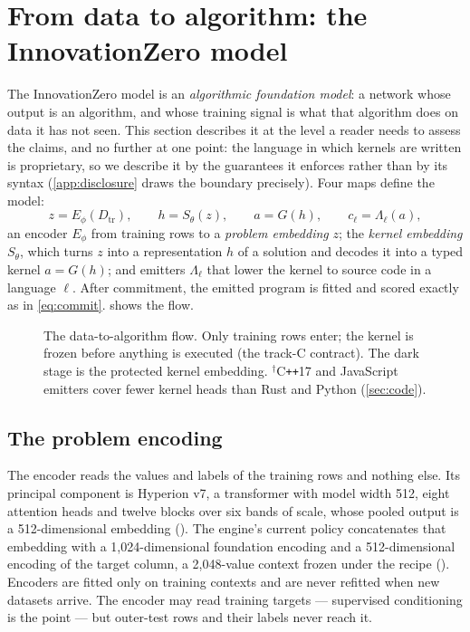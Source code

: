 \section{From data to algorithm: the InnovationZero model}
\label{sec:model}

The InnovationZero model is an \emph{algorithmic foundation model}: a network whose output is an
algorithm, and whose training signal is what that algorithm does on data it has not seen. This
section describes it at the level a reader needs to assess the claims, and no further at one
point: the language in which kernels are written is proprietary, so we describe it by the
guarantees it enforces rather than by its syntax (\cref{app:disclosure} draws the boundary
precisely). Four maps define the model:
\begin{equation}
z = E_\phi(D_{\mathrm{tr}}), \qquad h = S_\theta(z), \qquad a = G(h), \qquad c_\ell = \Lambda_\ell(a),
\label{eq:contract}
\end{equation}
an encoder $E_\phi$ from training rows to a \emph{problem embedding} $z$; the \emph{kernel
embedding} $S_\theta$, which turns $z$ into a representation $h$ of a solution and decodes it into
a typed kernel $a=G(h)$; and emitters $\Lambda_\ell$ that lower the kernel to source code in a
language $\ell$. After commitment, the emitted program is fitted and scored exactly as in
\cref{eq:commit}.  shows the flow.

\begin{figure}[t]
\centering

\caption{The data-to-algorithm flow. Only training rows enter; the kernel is frozen before anything
is executed (the track-C contract). The dark stage is the protected kernel embedding. $^\dag$C\texttt{++}17 and
JavaScript emitters cover fewer kernel heads than Rust and Python (\cref{sec:code}).}
\label{fig:pipeline}
\end{figure}

\subsection{The problem encoding}

The encoder reads the values and labels of the training rows and nothing else. Its principal
component is Hyperion v7, a transformer with model width 512, eight attention heads and twelve
blocks over six bands of scale, whose pooled output is a 512-dimensional embedding
(). The engine's current policy concatenates that embedding
with a 1,024-dimensional foundation encoding and a 512-dimensional encoding of the target column, a
2,048-value context frozen under the recipe 
(). Encoders are fitted only on training contexts and are never refitted
when new datasets arrive. The encoder may read training targets --- supervised conditioning is the
point --- but outer-test rows and their labels never reach it.

